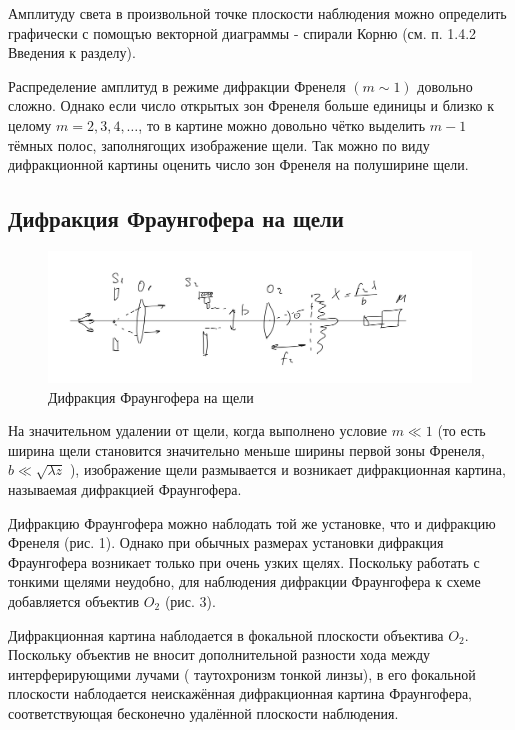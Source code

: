 \documentclass[a4paper, 12pt]{article}
\begin{document}
Амплитуду света в произвольной точке плоскости наблюдения можно определить графически с помощъю векторной диаграммы - спирали Корню (см. п. 1.4.2 Введения к разделу).

Распределение амплитуд в режиме дифракции Френеля $(m \sim 1)$ довольно сложно. Однако если число открытых зон Френеля больше единицы и близко к целому $m=2,3,4, \ldots$, то в картине можно довольно чётко выделить $m-1$ тёмных полос, заполнягощих изображение щели. Так можно по виду дифракционной картины оценить число зон Френеля на полуширине щели.

\subsection*{Дифракция Фраунгофера на щели}

\begin{figure}[H]
    \centering
    \includegraphics[width=1\textwidth]{fraun1.jpg}
    \caption{Дифракция Фраунгофера на щели}
    \label{fig:ris2}
\end{figure}


На значительном удалении от щели, когда выполнено условие $m \ll 1$ (то есть ширина щели становится значительно меньше ширины первой зоны Френеля, $b \ll \sqrt{\lambda z}$ ), изображение щели размывается и возникает дифракционная картина, называемая дифракцией Фраунгофера.

Дифракцию Фраунгофера можно наблодать той же установке, что и дифракцию Френеля (рис. 1). Однако при обычных размерах установки дифракция Фраунгофера возникает только при очень узких щелях. Поскольку работать с тонкими щелями неудобно, для наблюдения дифракции Фраунгофера к схеме добавляется объектив $O_2$ (рис. 3).

Дифракционная картина наблодается в фокальной плоскости объектива $O_2$. Поскольку объектив не вносит дополнительной разности хода между интерферирующими лучами ( таутохронизм тонкой линзы), в его фокальной плоскости наблодается неискажённая дифракционная картина Фраунгофера, соответствующая бесконечно удалённой плоскости наблюдения.
\end{document}
